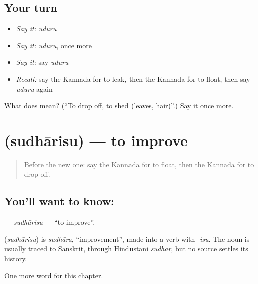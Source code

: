 \subsection*{Your turn}
\begin{itemize}
\raggedright
  \item \emph{Say it:} \emph{uduru}
  \item \emph{Say it:} \emph{uduru}, once more
  \item \emph{Say it:} say \emph{uduru}
  \item \emph{Recall:} say the Kannada for to leak, then the Kannada for to float, then say \emph{uduru} again
\end{itemize}

\begin{tcolorbox}[breakable,colback=teal!4,colframe=teal!35!black,title={Before you move on}]
What does  mean? (\textquotedblleft{}To drop off, to shed (leaves, hair)\textquotedblright{}.) Say it once more.
\end{tcolorbox}
\section[\texorpdfstring{\kn{ಸುಧಾರಿಸು} (sudhārisu)}{ಸುಧಾರಿಸು (sudhārisu)}]{ (sudhārisu) — to improve}

\label{lesson:KA-C167-sudharisu}



\begin{quote}
Before the new one: say the Kannada for to float, then the Kannada for to drop off.
\end{quote}

\subsection*{You'll want to know: }
\textbf{} — \emph{sudhārisu} — \textquotedblleft{}to improve\textquotedblright{}.

\begin{cousinweb}
\textbf{} (\emph{sudhārisu}) is \emph{sudhāra}, \textquotedblleft{}improvement\textquotedblright{}, made into a verb with \emph{-isu}. The noun is usually traced to Sanskrit, through Hindustani \emph{sudhār}, but no source settles its history.
\end{cousinweb}

\begin{grammarlens}[title={What you've built}]
One more word for this chapter.
\end{grammarlens}

